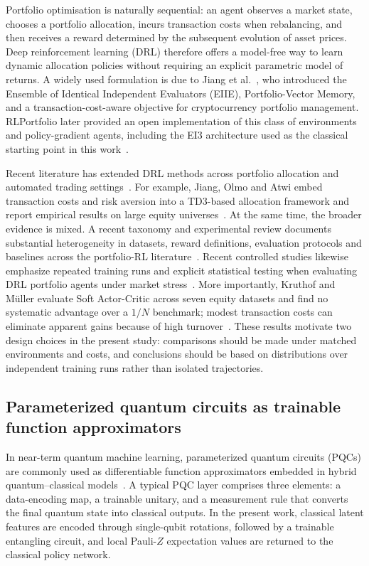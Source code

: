 \documentclass[aps,floatfix,superscriptaddress,twocolumn,tightenlines,amsmath,amssymb,nofootinbib,10pt,longbibliography,prl]{revtex4-2}
\begin{document}
Portfolio optimisation is naturally sequential: an agent observes a market state, chooses a
portfolio allocation, incurs transaction costs when rebalancing, and then receives a reward
determined by the subsequent evolution of asset prices. Deep reinforcement learning (DRL)
therefore offers a model-free way to learn dynamic allocation policies without requiring an
explicit parametric model of returns. A widely used formulation is due to Jiang et
al.~\cite{jiang2017deepreinforcementlearningframework}, who introduced the Ensemble of
Identical Independent Evaluators (EIIE), Portfolio-Vector Memory, and a
transaction-cost-aware objective for cryptocurrency portfolio management. RLPortfolio later
provided an open implementation of this class of environments and policy-gradient agents,
including the EI3 architecture used as the classical starting point in this
work~\cite{RLportfolio}.

Recent literature has extended DRL methods across portfolio allocation and automated trading
settings~\cite{Yang2020EnsembleTrading}. For example, Jiang, Olmo and Atwi embed transaction
costs and risk aversion into a TD3-based allocation framework and report empirical results
on large equity universes~\cite{Jiang2024DRLPortfolioSelection}. At the same time, the
broader evidence is mixed. A recent taxonomy and experimental review documents substantial
heterogeneity in datasets, reward definitions, evaluation protocols and baselines across the
portfolio-RL literature~\cite{Rezaei2025DRLPortfolioReview}. Recent controlled studies
likewise emphasize repeated training runs and explicit statistical testing when evaluating
DRL portfolio agents under market stress~\cite{Ayari2026FeatureConfigDRL}. More importantly,
Kruthof and M\"uller evaluate Soft Actor-Critic across seven equity datasets and find no
systematic advantage over a $1/N$ benchmark; modest transaction costs can eliminate apparent
gains because of high turnover~\cite{Kruthof2025CanDRLBeat1N}. These results motivate two
design choices in the present study: comparisons should be made under matched environments
and costs, and conclusions should be based on distributions over independent training runs
rather than isolated trajectories.

\subsection{Parameterized quantum circuits as trainable function approximators}
\label{subsec:bg-pqc}

In near-term quantum machine learning, parameterized quantum circuits (PQCs) are commonly
used as differentiable function approximators embedded in hybrid quantum--classical
models~\cite{Benedetti2019Parameterizedquant,Cerezo2021Variationalquantum}. A typical PQC
layer comprises three elements: a data-encoding map, a trainable unitary, and a measurement
rule that converts the final quantum state into classical outputs. In the present work,
classical latent features are encoded through single-qubit rotations, followed by a
trainable entangling circuit, and local Pauli-$Z$ expectation values are returned to the
classical policy network.
\end{document}
